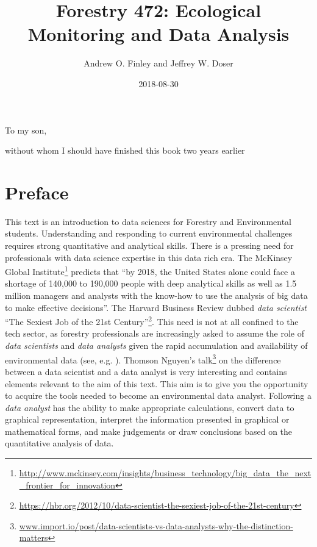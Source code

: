 \documentclass[]{krantz}
\title{Forestry 472: Ecological Monitoring and Data Analysis}
\author{Andrew O. Finley and Jeffrey W. Doser}
\date{2018-08-30}
\renewcommand{\href}[2]{#2\footnote{\url{#1}}}
\theoremstyle{definition}
\theoremstyle{definition}
\theoremstyle{definition}
\theoremstyle{remark}
\begin{document}
\maketitle


\thispagestyle{empty}

\begin{center}
To my son,

without whom I should have finished this book two years earlier
\end{center}

\setlength{\abovedisplayskip}{-5pt}
\setlength{\abovedisplayshortskip}{-5pt}

{
\hypersetup{linkcolor=black}
\setcounter{tocdepth}{2}
\tableofcontents
}
\listoftables
\listoffigures
\chapter*{Preface}\label{preface}


This text is an introduction to data sciences for Forestry and
Environmental students. Understanding and responding to current
environmental challenges requires strong quantitative and analytical
skills. There is a pressing need for professionals with data science
expertise in this data rich era. The
\href{http://www.mckinsey.com/insights/business_technology/big_data_the_next_frontier_for_innovation}{McKinsey
Global Institute} predicts that ``by 2018, the United States alone could
face a shortage of 140,000 to 190,000 people with deep analytical skills
as well as 1.5 million managers and analysts with the know-how to use
the analysis of big data to make effective decisions''. The Harvard
Business Review dubbed \emph{data scientist}
\href{https://hbr.org/2012/10/data-scientist-the-sexiest-job-of-the-21st-century}{``The
Sexiest Job of the 21st Century''}. This need is not at all confined to
the tech sector, as forestry professionals are increasingly asked to
assume the role of \emph{data scientists} and \emph{data analysts} given
the rapid accumulation and availability of environmental data (see, e.g.
\citet{Schimel2015}).
\href{www.import.io/post/data-scientists-vs-data-analysts-why-the-distinction-matters}{Thomson
Nguyen's talk} on the difference between a data scientist and a data
analyst is very interesting and contains elements relevant to the aim of
this text. This aim is to give you the opportunity to acquire the tools
needed to become an environmental data analyst. Following
\citet{Bravo16} a \emph{data analyst} has the ability to make
appropriate calculations, convert data to graphical representation,
interpret the information presented in graphical or mathematical forms,
and make judgements or draw conclusions based on the quantitative
analysis of data.
\end{document}
